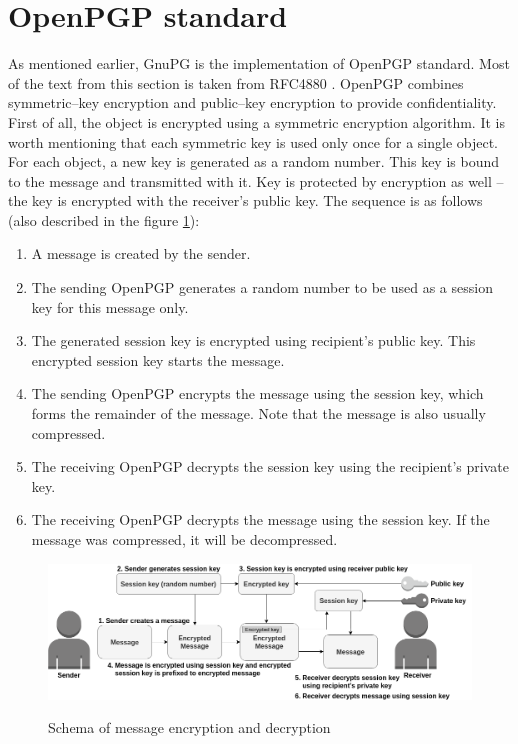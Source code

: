 \section{OpenPGP standard}
As mentioned earlier, GnuPG is the implementation of OpenPGP standard. Most of the text from this section is taken from RFC4880 \cite{RFC4880}. OpenPGP combines symmetric--key encryption and public--key encryption to provide confidentiality. First of all, the object is encrypted using a symmetric encryption algorithm. It is worth mentioning that each symmetric key is used only once for a single object. For each object, a new key is generated as a random number. This key is bound to the message and transmitted with it. Key is protected by encryption as well -- the key is encrypted with the receiver's public key. The sequence is as follows (also described in the figure \ref{img:messageEncryption}):
\begin{enumerate}
    \item A message is created by the sender.
    \item The sending OpenPGP generates a random number to be used as a session key for this message only.
    \item The generated session key is encrypted using recipient's public key. This encrypted session key starts the message.
    \item The sending OpenPGP encrypts the message using the session key, which forms the remainder of the message. Note that the message is also usually compressed.
    \item The receiving OpenPGP decrypts the session key using the recipient's private key.
    \item The receiving OpenPGP decrypts the message using the session key. If the message was compressed, it will be decompressed.
\end{enumerate}

\begin{figure}[H]
    \begin{center}
        \label{img:messageEncryption}
        \includegraphics[width=1.0\textwidth]{obrazky-figures/messageEncryption.png}
        \caption{Schema of message encryption and decryption}
    \end{center}
\end{figure}

